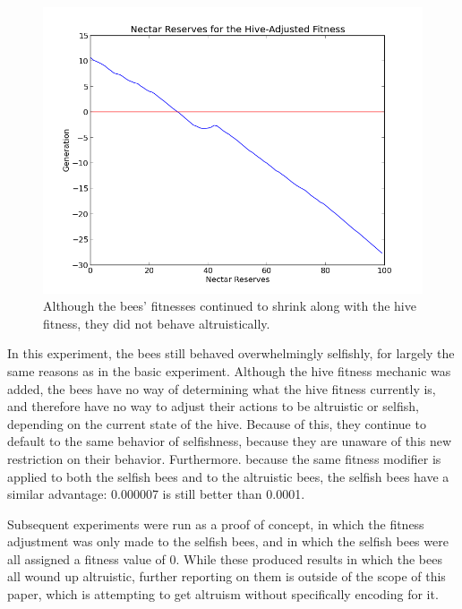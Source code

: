 \documentclass[11pt]{article}
\begin{document}
			\begin{figure}[tbph!]
				\begin{center}
					\includegraphics[scale=.5]{results/hive_fitness_res.png}
				\end{center}
				\caption{Although the bees' fitnesses continued to shrink along with the hive fitness, they did not behave altruistically.}
				\label{fig:hive_fitness_reserves}
			\end{figure}

			In this experiment, the bees still behaved overwhelmingly selfishly, for largely the same reasons as in the basic experiment. Although the hive fitness mechanic was added, the bees have no way of determining what the hive fitness currently is, and therefore have no way to adjust their actions to be altruistic or selfish, depending on the current state of the hive. Because of this, they continue to default to the same behavior of selfishness, because they are unaware of this new restriction on their behavior. Furthermore. because the same fitness modifier is applied to both the selfish bees and to the altruistic bees, the selfish bees have a similar advantage: 0.000007 is still better than 0.0001.

			Subsequent experiments were run as a proof of concept, in which the fitness adjustment was only made to the selfish bees, and in which the selfish bees were all assigned a fitness value of 0. While these produced results in which the bees all wound up altruistic, further reporting on them is outside of the scope of this paper, which is attempting to get altruism without specifically encoding for it.
\end{document}
